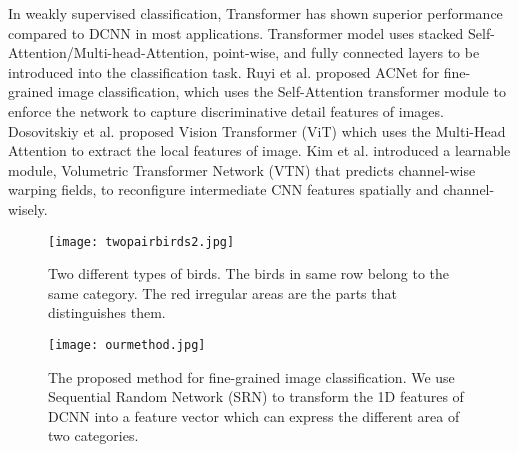 \documentclass[10pt,twocolumn,letterpaper]{article}
\begin{document}
In weakly supervised classification, Transformer\cite{transformerServey} has shown superior performance compared to DCNN in most applications. Transformer model uses stacked Self-Attention/Multi-head-Attention, point-wise, and fully connected layers to be introduced into the classification task. Ruyi et al. proposed ACNet\cite{Ji2020Attention} for fine-grained image classification, which uses the Self-Attention transformer module to enforce the network to capture discriminative detail features of images. Dosovitskiy et al.\cite{ImageWorth} proposed Vision Transformer (ViT) which uses the Multi-Head Attention to extract the local features of image. Kim et al.\cite{Kim2020} introduced a learnable module, Volumetric Transformer Network (VTN) that predicts channel-wise warping fields, to reconfigure intermediate CNN features spatially and channel-wisely.	
\begin{figure}[t]
	\begin{center}
		\texttt{[image: twopairbirds2.jpg]}
	\end{center}
	\caption{Two different types of birds. The birds in same row belong to the same category. The red irregular areas are the parts that distinguishes them.}
	\label{twopairbirds}		 
\end{figure}		
\begin{figure}[t]
	\begin{center}
		\texttt{[image: ourmethod.jpg]}
	\end{center}
	\caption{The proposed method for fine-grained image classification. We use Sequential Random Network (SRN) to transform the 1D features of DCNN into a feature vector which can express the different area of two categories.}
	\label{ourmethod}		 
\end{figure}					
\end{document}

